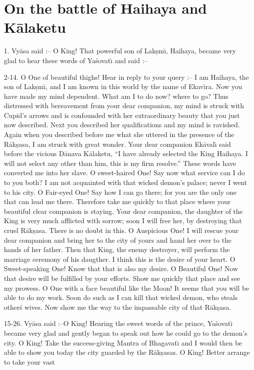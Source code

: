 \chapter{On the battle of Haihaya and K\=alaketu}

1. Vy\=asa said :-- O King! That powerful son of Lak\d{s}m\={\i}, Haihaya, became very glad to hear these words of Ya\'sovat\={\i} and said :--

2-14. O One of beautiful thighs! Hear in reply to your query :-- I am Haihaya, the son of Lak\d{s}m\={\i}, and I am known in this world by the name of Ekav\={\i}ra. Now you have made my mind dependent. What am I to do now? where to go? Thus distressed with bereavement from your dear companion, my mind is struck with Cupid's arrows and is confounded with her extraordinary beauty that you just now described. Next you described her qualifications and my mind is ravished. Again when you described before me what she uttered in the presence of the R\=ak\d{s}asa, I am struck with great wonder. Your dear companion Ek\=aval\={\i} said before the vicious D\=anava K\=alaketu, ``I have already selected the King Haihaya. I will not select any other than him, this is my firm resolve.'' These words have converted me into her slave. O sweet-haired One! Say now what service can I do to you both? I am not acquainted with that wicked demon's palace; never I went to his city. O Fair-eyed One! Say how I can go there; for you are the only one that can lead me there. Therefore take me quickly to that place where your beautiful clear companion is staying. Your dear companion, the daughter of the King is very much afflicted with sorrow; soon I will free her, by destroying that cruel R\=ak\d{s}asa. There is no doubt in this. O Auspicious One! I will rescue your dear companion and bring her to the city of yours and hand her over to the hands of her father. Then that King, the enemy destroyer, will perform the marriage ceremony of his daugther. I think this is the desire of your heart. O Sweet-speaking One! Know that that is also my desire. O Beautiful One! Now that desire will be fulfilled by your efforts. Show me quickly that place and see my prowess. O One with a face beautiful like the Moon! It seems that you will be able to do my work. Soon do such as I can kill that wicked demon, who steals other\'s wives. Now show me the way to the impassable city of that R\=ak\d{s}asa.

15-26. Vy\=asa said :--O King! Hearing the sweet words of the prince, Ya\'sovat\={\i} became very glad and gently began to speak out how he could go to the demon's city. O King! Take the success-giving Mantra of Bhagavat\={\i} and I would then be able to show you today the city guarded by the R\=ak\d{s}asas. O King! Better arrange to take your vast

